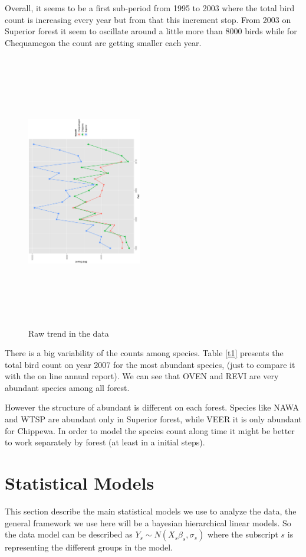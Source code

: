 \documentclass{article}
\begin{document}
Overall, it seems to be a first sub-period from 1995 to 2003 where the total bird count is increasing every year but from that this increment stop. From 2003 on Superior forest it seem to oscillate around a little more than 8000 birds while for Chequamegon the count are getting smaller each year. 

\begin{figure}[h!]
\centering
\includegraphics[height=12cm,width=5cm, angle=-90]{rawtrend.ps}
\caption{Raw trend in the data \label{figtr} }
\end{figure}

There is a big variability of the counts among species. Table \ref{t1} presents the total bird count on year 2007 for the most abundant species, (just to compare it with the on line annual report). We can see that OVEN and REVI are very abundant species among all forest. 

However the structure of abundant is different on each forest. Species like NAWA and WTSP are abundant only in Superior forest, while VEER it is only abundant for Chippewa. In order to model the species count along time it might be better to work separately by forest (at least in a initial steps).  



\newpage

\section{Statistical Models} 
This section describe the main statistical models we use to analyze the data, the general framework we use here will be a bayesian hierarchical linear models. So the data model can be described as $Y_s \sim N(X_s\beta_s, \sigma_s)$ where the subscript $s$ is representing the different groups in the model. 
\end{document}
